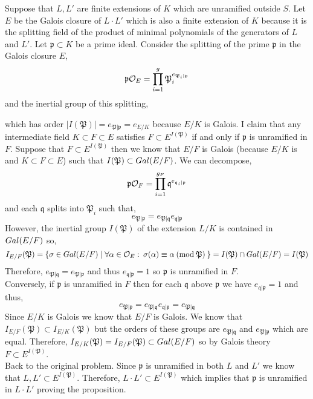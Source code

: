 \documentclass[12pt]{extarticle}
\begin{document}
Suppose that $L, L'$ are finite extensions of $K$ which are unramified outside $S$. Let $E$ be the Galois closure of $L \cdot L'$ which is also a finite extension of $K$ because it is the splitting field of the product of minimal polynomials of the generators of $L$ and $L'$. Let $\mathfrak{p} \subset K$ be a prime ideal. Consider the splitting of the prime $\mathfrak{p}$ in the Galois closure $E$,
\[ \mathfrak{p} \mathcal{O}_{E} = \prod_{i = 1}^g \mathfrak{P}_i^{e_{\mathfrak{P}_i | \mathfrak{p}}} \]
and the inertial group of this splitting,
\begin{center}
\end{center}
which has order $|I(\mathfrak{P})| = e_{\mathfrak{P} | \mathfrak{p}} = e_{E/K}$ because $E/K$ is Galois. I claim that any intermediate field $K \subset F \subset E$ satisfies $F \subset E^{I(\mathfrak{P})}$ if and only if $\mathfrak{p}$ is unramified in $F$. Suppose that $F \subset E^{I(\mathfrak{P})}$ then we know that $E/F$ is Galois (because $E/K$ is and $K \subset F \subset E$) such that $I(\mathfrak{P}) \subset Gal \small(E/F \small)$. We can decompose,
\[ \mathfrak{p} \mathcal{O}_{F} = \prod_{i = 1}^{g_F} \mathfrak{q}^{e_{\mathfrak{q}_i | \mathfrak{p}}} \]
and each $\mathfrak{q}$ splits into $\mathfrak{P}_i$ such that,
\[ e_{\mathfrak{P} | \mathfrak{p}} = e_{\mathfrak{P} | \mathfrak{q}} e_{\mathfrak{q} | \mathfrak{p}} \] 
However, the inertial group $I(\mathfrak{P})$ of the extension $L/K$ is contained in $Gal \small(E/F \small)$ so,
\[I_{E/F}(\mathfrak{P}) = \{ \sigma \in Gal \small(E/F \small) \mid \forall \alpha \in \mathcal{O}_{E} : \: \sigma(\alpha) \equiv \alpha \: (\mathrm{mod} \: \mathfrak{P}) \: \} = I(\mathfrak{P}) \cap Gal \small(E/F \small) = I(\mathfrak{P}) \]
Therefore, $e_{\mathfrak{P} | \mathfrak{q}} = e_{\mathfrak{P}|\mathfrak{p}}$ and thus $e_{\mathfrak{q} | \mathfrak{p}} = 1$ so $\mathfrak{p}$ is unramified in $F$. 
\bigskip\\
Conversely, if $\mathfrak{p}$ is unramified in $F$ then for each $\mathfrak{q}$ above $\mathfrak{p}$ we have $e_{\mathfrak{q} | \mathfrak{p}} = 1$ and thus,
\[e_{\mathfrak{P} | \mathfrak{p}} = e_{\mathfrak{P} | \mathfrak{q}} e_{\mathfrak{q} | \mathfrak{p}} = e_{\mathfrak{P} | \mathfrak{q}}\]
Since $E/K$ is Galois we know that $E/F$ is Galois. We know that $I_{E/F}(\mathfrak{P}) \subset I_{E/K}(\mathfrak{P})$ but the orders of these groups are $e_{\mathfrak{P} | \mathfrak{q}}$ and $e_{\mathfrak{P} | \mathfrak{p}}$ which are equal. Therefore, $I_{E/K}(\mathfrak{P}) = I_{E/F}(\mathfrak{P}) \subset Gal \small(E/F \small)$ so by Galois theory $F \subset E^{I(\mathfrak{P})}$. 
\bigskip\\
Back to the original problem. Since $\mathfrak{p}$ is unramified in both $L$ and $L'$ we know that $L, L' \subset E^{I(\mathfrak{P})}$. Therefore, $L \cdot L' \subset E^{I(\mathfrak{P})}$ which implies that $\mathfrak{p}$ is unramified in $L \cdot L'$ proving the proposition.   
\end{document}
